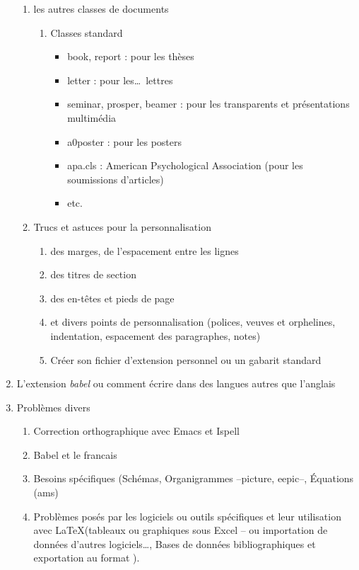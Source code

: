 \begin{enumerate}
  \begin{enumerate}
  \item les autres classes de documents
    \begin{enumerate}
    \item Classes standard
      \begin{itemize}
      \item book, report : pour les thèses
      \item letter : pour les\ldots\ lettres
      \item seminar, prosper, beamer : pour les transparents et présentations
        multimédia
      \item a0poster : pour les posters
      \item apa.cls : American Psychological Association (pour les soumissions
        d'articles)
      \item etc.
      \end{itemize}
    \end{enumerate}
  \item Trucs et astuces pour la personnalisation
    \begin{enumerate}
    \item des marges, de l'espacement entre les lignes
    \item des titres de section
    \item des en-têtes et pieds de page
    \item et divers points de personnalisation (polices, veuves et orphelines,
      indentation, espacement des paragraphes, notes)
    \item Créer son fichier d'extension personnel ou un gabarit standard
    \end{enumerate}
  \end{enumerate}
  
  
  \item L'extension \emph{babel} ou comment écrire dans des langues autres que
    l'anglais
  
  
  \item Problèmes divers
  
    \begin{enumerate}
    \item Correction orthographique avec Emacs et Ispell
    \item Babel et le francais
    \item Besoins spécifiques (Schémas, Organigrammes --picture, eepic--,
      \'Equations (ams)
    \item Problèmes posés par les logiciels ou outils spécifiques et leur
      utilisation avec \LaTeX (tableaux ou graphiques sous Excel -- ou
      importation de données d'autres logiciels\ldots, Bases de données
      bibliographiques et exportation au format \BiBTeX).
    \end{enumerate}
    

\end{enumerate}

